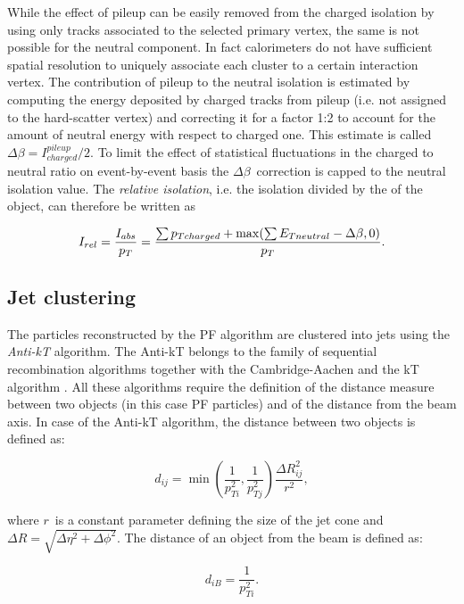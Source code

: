 While the effect of pileup can be easily removed from the charged isolation by using only tracks associated to the selected primary vertex, the same is not possible for the neutral component. In fact calorimeters do not have sufficient spatial resolution to uniquely associate each cluster to a certain interaction vertex. The contribution of pileup to the neutral isolation is estimated by computing the energy deposited by charged tracks from pileup (i.e. not assigned to the hard-scatter vertex) and correcting it for a factor 1:2 to account for the amount of neutral energy with respect to charged one. This estimate is called \emph{$\Delta\beta = I^{pileup}_{charged}/2$}. To limit the effect of statistical fluctuations in the charged to neutral ratio on event-by-event basis the $\Delta\beta$\ correction is capped to the neutral isolation value. The \emph{relative isolation}, i.e. the isolation divided by the \pT of the object, can therefore be written as

\begin{equation}
I_{rel} = \dfrac{I_{abs}}{p_{T}} =  \dfrac{\sum{p_{T charged}} + \operatorname{max}(\sum{E_{T neutral}} - \Delta \beta, 0)}{p_T}.
\label{eq:db_rel_iso}
\end{equation}

\subsection{Jet clustering}

The particles reconstructed by the PF algorithm are clustered into jets using the \emph{Anti-kT} \cite{Cacciari:2008gp} algorithm. The Anti-kT belongs to the family of sequential recombination algorithms together with the Cambridge-Aachen and the kT algorithm \cite{Ellis:1993tq,Dokshitzer:1997in}. All these algorithms require the definition of the distance measure between two objects (in this case PF particles) and of the distance from the beam axis. In case of the Anti-kT algorithm, the distance between two objects is defined as:

\begin{equation}
d_{ij} = \operatorname{min}(\dfrac{1}{p_{Ti}^2},\dfrac{1}{p_{Tj}^2})\dfrac{\Delta R_{ij}^2}{r^2},
\end{equation}

where $r$\ is a constant parameter defining the size of the jet cone and $\Delta R = \sqrt{\Delta \eta^2 + \Delta \phi^2}$.
The distance of an object from  the beam is defined as:

\begin{equation}
d_{iB} = \dfrac{1}{p_{Ti}^2}.
\end{equation}

